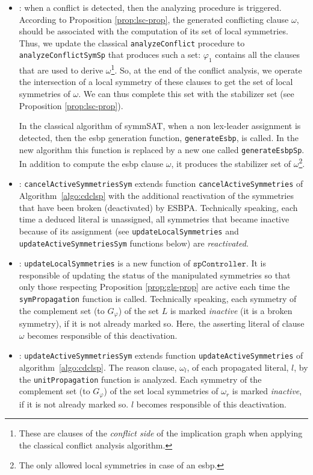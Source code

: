 \begin{itemize}[topsep=2pt]
 \item {}: when a conflict is detected, then the analyzing
 procedure is triggered. According to Proposition \ref{prop:lsc-prop}, the
 generated conflicting clause $\omega$, should be associated with the
 computation of its set of local symmetries. Thus, we update the classical
 \texttt{analyzeConflict} procedure to \texttt{analyzeConflictSymSp} that produces such
 a set: $\varphi_1$ contains all the clauses that are used to derive $\omega$\footnote{These are clauses of the \textit{conflict side} of the implication graph when applying the classical conflict analysis algorithm.}. So, at the end of the conflict analysis, we operate the intersection of a local symmetry of these clauses to get the set of local symmetries of $\omega$. We can thus complete this set with the stabilizer set (see Proposition \ref{prop:lsc-prop}).
 
 In the classical algorithm of symmSAT, when a non lex-leader assignment is detected, then the esbp generation function, \texttt{generateEsbp}, is
 called. In the new algorithm this function is replaced by a new one called
 \texttt{generateEsbpSp}. In addition to compute the esbp clause $\omega$, it
 produces the stabilizer set of $\omega$\footnote{The only allowed  local symmetries in case of an esbp.}.
 
 \item {}: \texttt{cancelActiveSymmetriesSym} extends function \texttt{cancelActiveSymmetries} of Algorithm~\ref{algo:cdclsp} with the additional reactivation of the symmetries that have been broken (deactivated) by ESBPA. Technically speaking, each time a deduced literal is unassigned, all symmetries that became inactive because of its assignment (see \texttt{updateLocalSymmetries} and \texttt{updateActiveSymmetriesSym} functions below) are \textit{reactivated}.
 
 \item {}: \texttt{updateLocalSymmetries} is a new function of
 $\texttt{spController}$. It is responsible of updating the status of the manipulated
 symmetries so that only those respecting Proposition \ref{prop:gls-prop} are
 active each time the \texttt{symPropagation} function is called. Technically speaking, each symmetry of the complement set (to $G_{\varphi}$) of the set $L$ is marked \textit{inactive} (it is a broken symmetry), if it is not already marked so. Here, the asserting literal of clause $\omega$ becomes responsible of this deactivation. 
 
 \item {}: \texttt{updateActiveSymmetriesSym} extends function \texttt{updateActiveSymmetries} of algorithm~\ref{algo:cdclsp}. The reason clause, $\omega_l$, of each propagated literal, $l$, by the \texttt{unitPropagation} function is analyzed. Each symmetry of the complement set (to $G_{\varphi}$) of the set local symmetries of $\omega_r$ is marked \textit{inactive}, if it is not already marked so. $l$ becomes responsible of this deactivation. 
\end{itemize}


